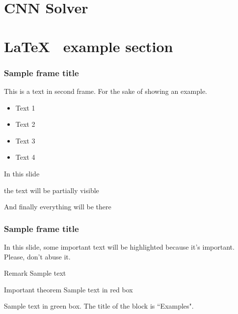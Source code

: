 \documentclass[aspectratio=169]{beamer}
\begin{document}

\section{CNN Solver}






\section{\LaTeX ~ example section}

\begin{frame}
\frametitle{Sample frame title}
This is a text in second frame. For the sake of showing an example.

\begin{itemize}
    \item Text 1
    \item Text 2
    \item Text 3
    \item Text 4
\end{itemize}
\end{frame}


\begin{frame}
In this slide \pause

the text will be partially visible \pause

And finally everything will be there
\end{frame}


\begin{frame}
\frametitle{Sample frame title}

In this slide, some important text will be
\alert{highlighted} because it's important.
Please, don't abuse it.

\begin{block}{Remark}
Sample text
\end{block}

\begin{alertblock}{Important theorem}
Sample text in red box
\end{alertblock}

\begin{examples}
Sample text in green box. The title of the block is ``Examples".
\end{examples}
\end{frame}
\end{document}
